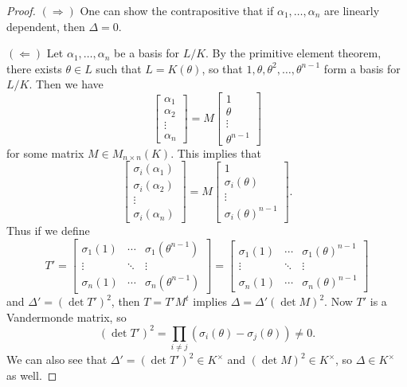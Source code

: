 \begin{proof}
  $(\Rightarrow)$ One can show the contrapositive
  that if $\alpha_1, \dots, \alpha_n$ are linearly
  dependent, then $\Delta = 0$.

  $(\Leftarrow)$ Let $\alpha_1, \dots, \alpha_n$
  be a basis for $L / K$.
  By the primitive element theorem, there exists
  $\theta \in L$ such that $L = K(\theta)$, so
  that $1, \theta, \theta^2, \dots, \theta^{n - 1}$
  form a basis for $L / K$. Then we have
  \[
    \begin{bmatrix}
      \alpha_1 \\ \alpha_2 \\ \vdots \\ \alpha_n
    \end{bmatrix}
    = M
    \begin{bmatrix}
      1 \\ \theta \\ \vdots \\ \theta^{n - 1}
    \end{bmatrix}
  \]
  for some matrix $M \in M_{n \times n}(K)$.
  This implies that
  \[
    \begin{bmatrix}
      \sigma_i(\alpha_1) \\ \sigma_i(\alpha_2) \\ \vdots \\ \sigma_i(\alpha_n)
    \end{bmatrix}
    = M
    \begin{bmatrix}
      1 \\ \sigma_i(\theta) \\ \vdots \\ \sigma_i(\theta)^{n - 1}
    \end{bmatrix}.
  \]
  Thus if we define
  \[
    T' =
    \begin{bmatrix}
      \sigma_1(1) & \cdots & \sigma_1(\theta^{n - 1}) \\
      \vdots & \ddots & \vdots \\
      \sigma_n(1) & \cdots & \sigma_n(\theta^{n - 1})
    \end{bmatrix}
    =
    \begin{bmatrix}
      \sigma_1(1) & \cdots & \sigma_1(\theta)^{n - 1} \\
      \vdots & \ddots & \vdots \\
      \sigma_n(1) & \cdots & \sigma_n(\theta)^{n - 1}
    \end{bmatrix}
  \]
  and $\Delta' = (\det T')^2$, then
  $T = T' M^t$ implies $\Delta = \Delta' (\det M)^2$.
  Now $T'$ is a Vandermonde matrix, so
  \[
    (\det T')^2 = \prod_{i \ne j} (\sigma_i(\theta) - \sigma_j(\theta)) \ne 0.
  \]
  We can also see that $\Delta' = (\det T')^2 \in K^\times$
  and $(\det M)^2 \in K^\times$, so
  $\Delta \in K^\times$ as well.
\end{proof}

